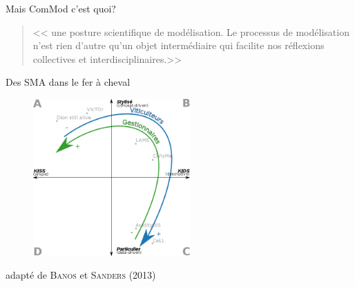 \documentclass[newPxFont]{beamer}
\begin{document}
\begin{frame}[c]{Mais ComMod c'est quoi?}
  \vspace{-2em}
  \begin{quote}
    << une posture scientifique de modélisation. Le processus de modélisation n'est rien d'autre qu'un objet intermédiaire qui facilite nos réflexions collectives et interdisciplinaires.>>
  \end{quote}
  \vspace{-2em}
  \begin{figure}
    \hspace{0.2em} %
     \hspace{0.2em} %
  \end{figure}
\end{frame}

\begin{frame}[c]{Des SMA dans le fer à cheval}
  \vspace{-2em}
  \begin{figure}
   \includegraphics[height=6cm]{img/a_banos_sanders_positionnements.png}
  \end{figure}
  \hspace*{\fill}adapté de \textsc{Banos} et \textsc{Sanders} (2013)
\end{frame}
\end{document}
